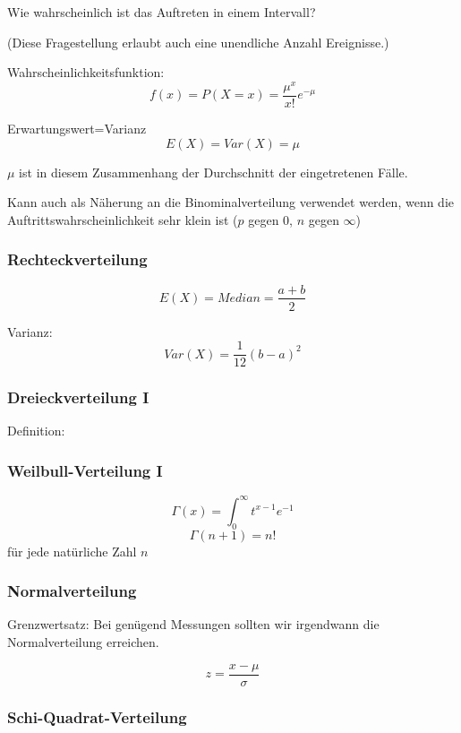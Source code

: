 Wie wahrscheinlich ist das Auftreten in einem Intervall?

(Diese Fragestellung erlaubt auch eine unendliche Anzahl Ereignisse.)

Wahrscheinlichkeitsfunktion:
\[
	f(x) = P(X=x) = \frac{\mu^x}{x!}e^{-\mu}
\]

Erwartungswert=Varianz
\[
	E(X) = Var(X) = \mu
\]

$\mu$ ist in diesem Zusammenhang der Durchschnitt der eingetretenen Fälle.

Kann auch als Näherung an die Binominalverteilung verwendet werden, wenn die Auftrittswahrscheinlichkeit sehr klein ist ($p$ gegen $0$, $n$ gegen $\infty$)

\subsubsection{Rechteckverteilung}

\[
	E(X) = Median = \frac{a+b}2
\]

Varianz:
\[
	Var(X) = \frac{1}{12}(b-a)^2
\]


\subsubsection{Dreieckverteilung I}

Definition:


\subsubsection{Weilbull-Verteilung I}



\[
	\Gamma(x) = \int^\infty_0 t^{x-1} e^{-1}
\]
\[
\Gamma(n+1) = n!
\]
für jede natürliche Zahl $n$

\subsubsection{Normalverteilung}

Grenzwertsatz: Bei genügend Messungen sollten wir irgendwann die Normalverteilung erreichen.



\[
	z = \frac{x - \mu}{\sigma}
\]


\subsubsection{Schi-Quadrat-Verteilung}

